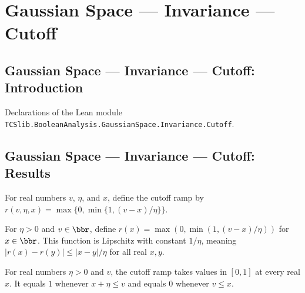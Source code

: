 \section{Gaussian Space --- Invariance --- Cutoff}
\subsection*{Gaussian Space --- Invariance --- Cutoff: Introduction}

Declarations of the Lean module \texttt{TCSlib.BooleanAnalysis.GaussianSpace.Invariance.Cutoff}.

\subsection*{Gaussian Space --- Invariance --- Cutoff: Results}

\begin{definition}
\label{BooleanAnalysis.GaussianSpace.Invariance.cutoffRamp}
\leanok
For real numbers $v$, $\eta$, and $x$, define the cutoff ramp by
$r(v,\eta,x)=\max\{0,\min\{1,(v-x)/\eta\}\}$.
\end{definition}

\begin{theorem}
\label{BooleanAnalysis.GaussianSpace.Invariance.lipschitz_cutoffRamp}
\leanok
{}
For $\eta>0$ and $v\in\bbr$, define $r(x)=\max(0,\min(1,(v-x)/\eta))$ for $x\in\bbr$.
This function is Lipschitz with constant $1/\eta$, meaning $|r(x)-r(y)|\le |x-y|/\eta$
for all real $x,y$.
\end{theorem}

\begin{theorem}
\label{BooleanAnalysis.GaussianSpace.Invariance.cutoffRamp_bounds}
\leanok
{}
For real numbers $\eta>0$ and $v$, the cutoff ramp takes values in $[0,1]$ at every real
$x$. It equals $1$ whenever $x+\eta\le v$ and equals $0$ whenever $v\le x$.
\end{theorem}

